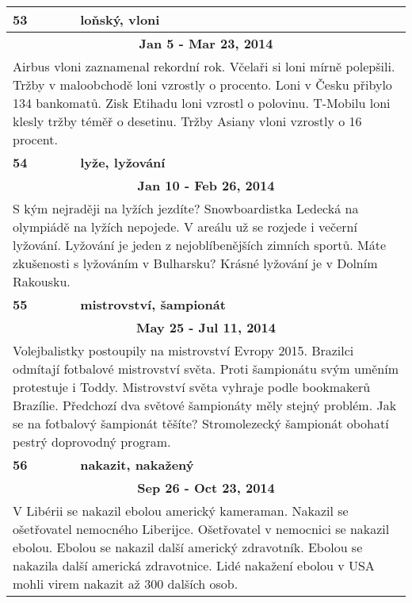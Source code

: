 \begin{tabularx}{\linewidth}{l l}
\bf 53 & \bf loňský, vloni \\ \midrule
\multicolumn{2}{c}{\bf Jan 5 - Mar 23, 2014} \\
\multicolumn{2}{p{\linewidth}}{Airbus vloni zaznamenal rekordní rok. Včelaři si loni mírně polepšili. Tržby v maloobchodě loni vzrostly o procento. Loni v Česku přibylo 134 bankomatů. Zisk Etihadu loni vzrostl o polovinu. T-Mobilu loni klesly tržby téměř o desetinu. Tržby Asiany vloni vzrostly o 16 procent.} \\ \midrule[1.5pt]

\bf 54 & \bf lyže, lyžování \\ \midrule
\multicolumn{2}{c}{\bf Jan 10 - Feb 26, 2014} \\
\multicolumn{2}{p{\linewidth}}{S kým nejraději na lyžích jezdíte? Snowboardistka Ledecká na olympiádě na lyžích nepojede. V areálu už se rozjede i večerní lyžování. Lyžování je jeden z nejoblíbenějších zimních sportů. Máte zkušenosti s lyžováním v Bulharsku? Krásné lyžování je v Dolním Rakousku.} \\ \midrule[1.5pt]

\bf 55 & \bf mistrovství, šampionát \\ \midrule
\multicolumn{2}{c}{\bf May 25 - Jul 11, 2014} \\
\multicolumn{2}{p{\linewidth}}{Volejbalistky postoupily na mistrovství Evropy 2015. Brazilci odmítají fotbalové mistrovství světa. Proti šampionátu svým uměním protestuje i Toddy. Mistrovství světa vyhraje podle bookmakerů Brazílie. Předchozí dva světové šampionáty měly stejný problém. Jak se na fotbalový šampionát těšíte? Stromolezecký šampionát obohatí pestrý doprovodný program.} \\ \midrule[1.5pt]

\bf 56 & \bf nakazit, nakažený \\ \midrule
\multicolumn{2}{c}{\bf Sep 26 - Oct 23, 2014} \\
\multicolumn{2}{p{\linewidth}}{V Libérii se nakazil ebolou americký kameraman. Nakazil se ošetřovatel nemocného Liberijce. Ošetřovatel v nemocnici se nakazil ebolou. Ebolou se nakazil další americký zdravotník. Ebolou se nakazila další americká zdravotnice. Lidé nakažení ebolou v USA mohli virem nakazit až 300 dalších osob.} \\ \midrule[1.5pt]


\end{tabularx}
